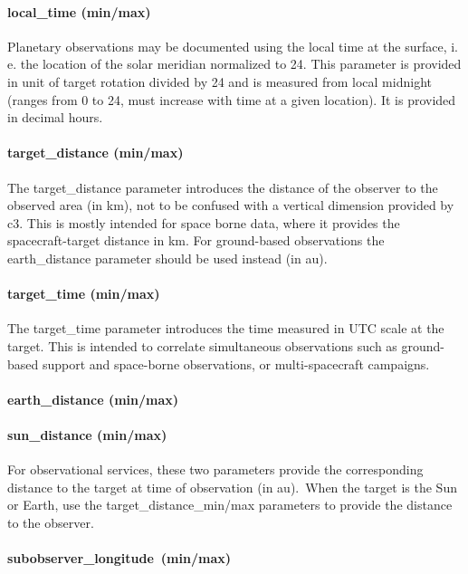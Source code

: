 \documentclass[11pt,a4paper]{ivoa}
\begin{document}
\paragraph{local\_time (min/max)}

Planetary observations may be documented using the local time at the surface, i. e. the location of the solar meridian normalized to 24. This parameter is provided in unit of target rotation divided by 24 and is measured from local midnight (ranges from 0 to 24, must increase with time at a given location). It is provided in decimal hours.

\paragraph{target\_distance (min/max)}

The target\_distance parameter introduces the distance of the observer to the observed area (in km), not to be confused with a vertical dimension provided by c3. This is mostly intended for space borne data, where it provides the spacecraft-target distance in km. For ground-based observations the earth\_distance parameter should be used instead (in au).

\paragraph{target\_time (min/max)}

The target\_time parameter introduces the time measured in UTC scale at the target. This is intended to correlate simultaneous observations such as ground-based support and space-borne observations, or multi-spacecraft campaigns.

\paragraph{earth\_distance (min/max)}

\paragraph{sun\_distance (min/max)}

For observational services, these two parameters provide the corresponding distance to the target at time of observation (in au). When the target is the Sun or Earth, use the target\_distance\_min/max parameters to provide the distance to the observer.

\paragraph{subobserver\_longitude (min/max)}
\end{document}
